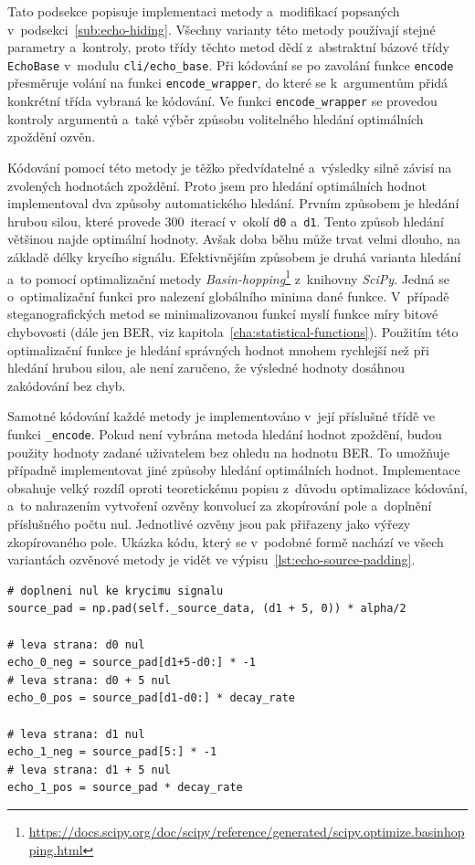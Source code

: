 Tato podsekce popisuje implementaci metody a~modifikací popsaných
v~podsekci~\ref{sub:echo-hiding}. Všechny varianty této metody používají stejné
parametry a~kontroly, proto třídy těchto metod dědí z~abstraktní bázové třídy
\texttt{EchoBase} v~modulu \texttt{cli/echo\_base}. Při kódování se po zavolání
funkce \texttt{encode} přesměruje volání na funkci \texttt{encode\_wrapper}, do
které se k~argumentům přidá konkrétní třída vybraná ke kódování. Ve funkci
\texttt{encode\_wrapper} se provedou kontroly argumentů a~také výběr způsobu
volitelného hledání optimálních zpoždění ozvěn.

Kódování pomocí této metody je těžko předvídatelné a~výsledky silně závisí na
zvolených hodnotách zpoždění. Proto jsem pro hledání optimálních hodnot
implementoval dva způsoby automatického hledání. Prvním způsobem je hledání
hrubou silou, které provede 300~iterací v~okolí \texttt{d0} a~\texttt{d1}.
Tento způsob hledání většinou najde optimální hodnoty. Avšak doba běhu může
trvat velmi dlouho, na základě délky krycího signálu. Efektivnějším způsobem je
druhá varianta hledání a~to pomocí optimalizační metody
\textit{Basin-hopping}\footnote{\url{https://docs.scipy.org/doc/scipy/reference/generated/scipy.optimize.basinhopping.html}}
z~knihovny \textit{SciPy}. Jedná se o~optimalizační funkci pro nalezení
globálního minima dané funkce. V~případě steganografických metod se
minimalizovanou funkcí myslí funkce míry bitové chybovosti (dále jen BER, viz
kapitola~\ref{cha:statistical-functions}). Použitím této optimalizační funkce
je hledání správných hodnot mnohem rychlejší než při hledání hrubou silou, ale
není zaručeno, že výsledné hodnoty dosáhnou zakódování bez chyb.

Samotné kódování každé metody je implementováno v~její příslušné třídě ve
funkci \texttt{\_encode}. Pokud není vybrána metoda hledání hodnot zpoždění,
budou použity hodnoty zadané uživatelem bez ohledu na hodnotu BER. To umožňuje
případně implementovat jiné způsoby hledání optimálních hodnot. Implementace
obsahuje velký rozdíl oproti teoretickému popisu z~důvodu optimalizace
kódování, a~to nahrazením vytvoření ozvěny konvolucí za zkopírování pole
a~doplnění příslušného počtu nul. Jednotlivé ozvěny jsou pak přiřazeny jako
výřezy zkopírovaného pole. Ukázka kódu, který se v~podobné formě nachází ve
všech variantách ozvěnové metody je vidět ve
výpisu~\ref{lst:echo-source-padding}.

\begin{lstlisting}[language=PythonPlus, label={lst:echo-source-padding},
caption={Vytvoření pouze jedné kopie krycího signálu a~přiřazení jednotlivých
ozvěn jako výřezy.}]
# doplneni nul ke krycimu signalu
source_pad = np.pad(self._source_data, (d1 + 5, 0)) * alpha/2

# leva strana: d0 nul
echo_0_neg = source_pad[d1+5-d0:] * -1
# leva strana: d0 + 5 nul
echo_0_pos = source_pad[d1-d0:] * decay_rate

# leva strana: d1 nul
echo_1_neg = source_pad[5:] * -1
# leva strana: d1 + 5 nul
echo_1_pos = source_pad * decay_rate
\end{lstlisting}

